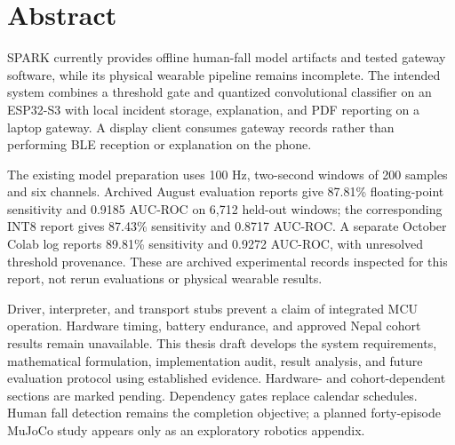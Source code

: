 \chapter*{Abstract}
SPARK currently provides offline human-fall model artifacts and tested gateway software, while its physical wearable pipeline remains incomplete. The intended system combines a threshold gate and quantized convolutional classifier on an ESP32-S3 with local incident storage, explanation, and PDF reporting on a laptop gateway. A display client consumes gateway records rather than performing BLE reception or explanation on the phone.

The existing model preparation uses 100 Hz, two-second windows of 200 samples and six channels. Archived August evaluation reports give 87.81\% floating-point sensitivity and 0.9185 AUC-ROC on 6,712 held-out windows; the corresponding INT8 report gives 87.43\% sensitivity and 0.8717 AUC-ROC. A separate October Colab log reports 89.81\% sensitivity and 0.9272 AUC-ROC, with unresolved threshold provenance. These are archived experimental records inspected for this report, not rerun evaluations or physical wearable results.

Driver, interpreter, and transport stubs prevent a claim of integrated MCU operation. Hardware timing, battery endurance, and approved Nepal cohort results remain unavailable. This thesis draft develops the system requirements, mathematical formulation, implementation audit, result analysis, and future evaluation protocol using established evidence. Hardware- and cohort-dependent sections are marked pending. Dependency gates replace calendar schedules. Human fall detection remains the completion objective; a planned forty-episode MuJoCo study appears only as an exploratory robotics appendix.
